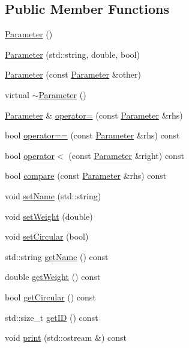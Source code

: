 \subsection*{Public Member Functions}
\begin{DoxyCompactItemize}
\item 
\mbox{\hyperlink{class_parameter_a5ba93ca36c3261d3850e67f92717c2f5}{Parameter}} ()
\item 
\mbox{\hyperlink{class_parameter_a0a13c1589f500cceea00532061e37815}{Parameter}} (std\+::string, double, bool)
\item 
\mbox{\hyperlink{class_parameter_ad3f5d861da24673d97bd1bd206b0b89a}{Parameter}} (const \mbox{\hyperlink{class_parameter}{Parameter}} \&other)
\item 
virtual \mbox{\hyperlink{class_parameter_a6e2ade42a712f1d3675653329266e42d}{$\sim$\+Parameter}} ()
\item 
\mbox{\hyperlink{class_parameter}{Parameter}} \& \mbox{\hyperlink{class_parameter_a3bd55c637ccb3891e09cfa4a6bec91f5}{operator=}} (const \mbox{\hyperlink{class_parameter}{Parameter}} \&rhs)
\item 
bool \mbox{\hyperlink{class_parameter_ada4106ab9962e61d1aecf5bf032290c3}{operator==}} (const \mbox{\hyperlink{class_parameter}{Parameter}} \&rhs) const
\item 
bool \mbox{\hyperlink{class_parameter_a4f7b83d21a705a91947da01166c3f799}{operator$<$}} (const \mbox{\hyperlink{class_parameter}{Parameter}} \&right) const
\item 
bool \mbox{\hyperlink{class_parameter_adb0e139c6aeaedc4ee1e9432d464e9bc}{compare}} (const \mbox{\hyperlink{class_parameter}{Parameter}} \&rhs) const
\item 
void \mbox{\hyperlink{class_parameter_af399de059c88d2ae0b27afd3cb998261}{set\+Name}} (std\+::string)
\item 
void \mbox{\hyperlink{class_parameter_ad0682af0270bd689cfa0e571dd58138d}{set\+Weight}} (double)
\item 
void \mbox{\hyperlink{class_parameter_a77543a69497a6da692c76707207a6562}{set\+Circular}} (bool)
\item 
std\+::string \mbox{\hyperlink{class_parameter_aedb83bcd926fb8df7dc5ee31a1066baa}{get\+Name}} () const
\item 
double \mbox{\hyperlink{class_parameter_a2fcb32200dafaa276b7a1ca61f135f72}{get\+Weight}} () const
\item 
bool \mbox{\hyperlink{class_parameter_a8f0f2e92941e8bbae49de6388c87fdf8}{get\+Circular}} () const
\item 
std\+::size\+\_\+t \mbox{\hyperlink{class_parameter_a12c2b322265422eea431043dd50f047d}{get\+ID}} () const
\item 
void \mbox{\hyperlink{class_parameter_a93bd0debbfe144b2c1dd68aca79adfb2}{print}} (std\+::ostream \&) const
\end{DoxyCompactItemize}
